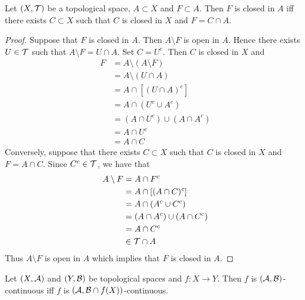 \documentclass{book}
\begin{document}
\begin{ex}
	Let $(X, \mathcal{T})$ be a topological space, $A \subset X$ and $F \subset A$. Then $F$ is closed in $A$ iff there exists $C \subset X$ such that $C$ is closed in $X$ and $F = C \cap A$. 
\end{ex}

\begin{proof}
	Suppose that $F$ is closed in $A$. Then $A \setminus F$ is open in $A$. Hence there exists $U \in \mathcal{T}$ such that $A \setminus F = U \cap A$. Set $C = U^c$. Then $C$ is closed in $X$ and  
	\begin{align*}
		F
		& = A \setminus (A \setminus F) \\
		& = A \setminus (U \cap A) \\
		& = A \cap [(U \cap A)^c] \\
		& = A \cap (U^c \cup A^c) \\
		& = (A \cap U^c) \cup (A \cap A^c) \\
		& = A \cap U^c \\
		& = A \cap C
	\end{align*}
Conversely, suppose that there exists $C \subset X$ such that $C$ is closed in $X$ and $F = A \cap C$. Since $C^c \in \mathcal{T}$, we have that  
\begin{align*}
	A \setminus F
	& = A \cap F^c \\
	& = A \cap [(A \cap C)^c] \\
	& = A \cap (A^c \cup C^c) \\
	& = (A \cap A^c) \cup (A \cap C^c) \\
	& = A \cap C^c \\
	& \in \mathcal{T} \cap A
\end{align*}
Thus $A \setminus F$ is open in $A$ which implies that $F$ is closed in $A$.
\end{proof}

\begin{ex}
	Let $(X, \mathcal{A})$ and $(Y, \mathcal{B})$ be topological spaces and $f:X \rightarrow Y$. Then $f$ is $(\mathcal{A}, \mathcal{B})$-continuous iff $f$ is $(\mathcal{A}, \mathcal{B} \cap f(X))$-continuous.
\end{ex}
\end{document}
